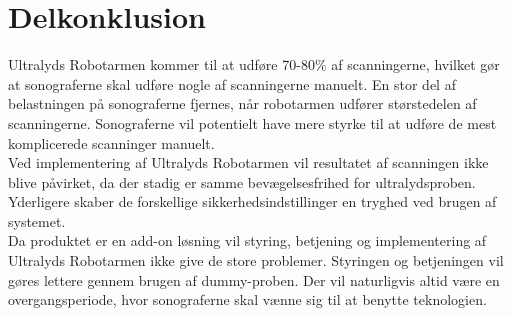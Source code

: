 \section{Delkonklusion}
Ultralyds Robotarmen kommer til at udføre 70-80\% af scanningerne, hvilket gør at sonograferne skal udføre nogle af scanningerne manuelt. En stor del af belastningen på sonograferne fjernes, når robotarmen udfører størstedelen af scanningerne. Sonograferne vil potentielt have mere styrke til at udføre de mest komplicerede scanninger manuelt. \\
Ved implementering af Ultralyds Robotarmen vil resultatet af scanningen ikke blive påvirket, da der stadig er samme bevægelsesfrihed for ultralydsproben. Yderligere skaber de forskellige sikkerhedsindstillinger en tryghed ved brugen af systemet.\\ 
Da produktet er en add-on løsning vil styring, betjening og implementering af Ultralyds Robotarmen ikke give de store problemer. Styringen og betjeningen vil gøres lettere gennem brugen af dummy-proben.  
Der vil naturligvis altid være en overgangsperiode, hvor sonograferne skal vænne sig til at benytte teknologien. 


